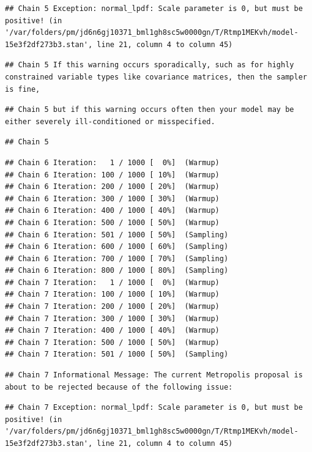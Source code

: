 \documentclass[
]{book}
\begin{document}
\begin{verbatim}
## Chain 5 Exception: normal_lpdf: Scale parameter is 0, but must be positive! (in '/var/folders/pm/jd6n6gj10371_bml1gh8sc5w0000gn/T/Rtmp1MEKvh/model-15e3f2df273b3.stan', line 21, column 4 to column 45)
\end{verbatim}

\begin{verbatim}
## Chain 5 If this warning occurs sporadically, such as for highly constrained variable types like covariance matrices, then the sampler is fine,
\end{verbatim}

\begin{verbatim}
## Chain 5 but if this warning occurs often then your model may be either severely ill-conditioned or misspecified.
\end{verbatim}

\begin{verbatim}
## Chain 5
\end{verbatim}

\begin{verbatim}
## Chain 6 Iteration:   1 / 1000 [  0%]  (Warmup) 
## Chain 6 Iteration: 100 / 1000 [ 10%]  (Warmup) 
## Chain 6 Iteration: 200 / 1000 [ 20%]  (Warmup) 
## Chain 6 Iteration: 300 / 1000 [ 30%]  (Warmup) 
## Chain 6 Iteration: 400 / 1000 [ 40%]  (Warmup) 
## Chain 6 Iteration: 500 / 1000 [ 50%]  (Warmup) 
## Chain 6 Iteration: 501 / 1000 [ 50%]  (Sampling) 
## Chain 6 Iteration: 600 / 1000 [ 60%]  (Sampling) 
## Chain 6 Iteration: 700 / 1000 [ 70%]  (Sampling) 
## Chain 6 Iteration: 800 / 1000 [ 80%]  (Sampling) 
## Chain 7 Iteration:   1 / 1000 [  0%]  (Warmup) 
## Chain 7 Iteration: 100 / 1000 [ 10%]  (Warmup) 
## Chain 7 Iteration: 200 / 1000 [ 20%]  (Warmup) 
## Chain 7 Iteration: 300 / 1000 [ 30%]  (Warmup) 
## Chain 7 Iteration: 400 / 1000 [ 40%]  (Warmup) 
## Chain 7 Iteration: 500 / 1000 [ 50%]  (Warmup) 
## Chain 7 Iteration: 501 / 1000 [ 50%]  (Sampling)
\end{verbatim}

\begin{verbatim}
## Chain 7 Informational Message: The current Metropolis proposal is about to be rejected because of the following issue:
\end{verbatim}

\begin{verbatim}
## Chain 7 Exception: normal_lpdf: Scale parameter is 0, but must be positive! (in '/var/folders/pm/jd6n6gj10371_bml1gh8sc5w0000gn/T/Rtmp1MEKvh/model-15e3f2df273b3.stan', line 21, column 4 to column 45)
\end{verbatim}
\end{document}
